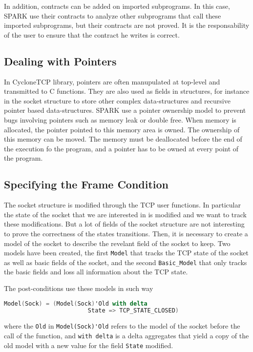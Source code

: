 \documentclass[runningheads]{llncs}
\begin{document}
    In addition, contracts can be added on imported subprograms. In this case,
    SPARK use their contracts to analyze other subprograms that call these imported
    subprograms, but their contracts are not proved. It is the responsability of the
    user to ensure that the contract he writes is correct.

\subsection{Dealing with Pointers}

    In CycloneTCP library, pointers are often manupulated at top-level and
    transmitted to C functions.  They are also used as fields in structures,
    for instance in the socket structure to store other complex data-structures
    and recursive pointer based data-structures.
    SPARK use a pointer ownership model to prevent bugs involving pointers such
    as memory leak or double free. When memory is allocated, the pointer pointed
    to this memory area is owned. The ownership of this memory can be moved.
    The memory must be deallocated before the end of the execution fo the program,
    and a pointer has to be owned at every point of the program.


\subsection{Specifying the Frame Condition}

    The socket structure is modified through the TCP user functions. In particular
    the state of the socket that we are interested in is modified and we want to
    track these modifications. But a lot of fields of the socket structure are not
    interesting to prove the correctness of the states transitions. Then, it is
    necessary to create a model of the socket to describe the revelant field of
    the socket to keep. Two models have been created, the first \lstinline{Model}
    that tracks the TCP state of the socket as well as basic fields of the socket,
    and the second \lstinline{Basic_Model} that only tracks the basic fields and
    loss all information about the TCP state.

    The post-conditions use these models in such way
    \begin{lstlisting}[language=Ada]
    Model(Sock) = (Model(Sock)'Old with delta
                        State => TCP_STATE_CLOSED)
    \end{lstlisting}
    where the \lstinline{Old} in \lstinline{Model(Sock)'Old} refers to the model
    of the socket before the call of the function, and \lstinline{with delta} is
    a delta aggregates that yield a copy of the old model with a new value for
    the field \lstinline{State} modified.
\end{document}
